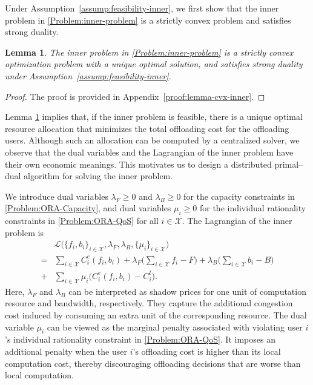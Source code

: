 \documentclass[lettersize,journal]{IEEEtran}
\newtheorem{lemma}{Lemma}
\begin{document}
Under Assumption~\ref{assump:feasibility-inner}, we first show that the inner problem in \eqref{Problem:inner-problem} is a strictly convex problem and satisfies strong duality.

\begin{lemma}\label{lemma-cvx-inner}
The inner problem in \eqref{Problem:inner-problem} is a strictly convex optimization problem with a unique optimal solution, and satisfies strong duality under Assumption~\ref{assump:feasibility-inner}.
\end{lemma}
\begin{proof}
The proof is provided in Appendix~\ref{proof:lemma-cvx-inner}.
\end{proof}

Lemma \ref{lemma-cvx-inner} implies that, if the inner problem is feasible, there is a unique optimal resource allocation that minimizes the total offloading cost for the offloading users. Although such an allocation can be computed by a centralized solver, we observe that the dual variables and the Lagrangian of the inner problem have their own economic meanings. This motivates us to design a distributed primal–dual algorithm for solving the inner problem.

We introduce dual variables
\(\lambda_F \ge 0\) and \(\lambda_B \ge 0\) for the capacity constraints in
\eqref{Problem:ORA-Capacity}, and dual variables \(\mu_i \ge 0\) for the individual rationality constraints in
\eqref{Problem:ORA-QoS} for all \(i\in \mathcal{X}\). The Lagrangian of the inner problem is
\begin{align}
&\mathcal{L}\big(\{f_i,b_i\}_{i\in \mathcal{X}},\lambda_F,\lambda_B,\{\mu_i\}_{i\in \mathcal{X}}\big)\nonumber\\
= &\sum_{i\in \mathcal{X}} C_i^e(f_i,b_i)
+ \lambda_F\Big(\sum_{i\in \mathcal{X}} f_i - F\Big)
+ \lambda_B\Big(\sum_{i\in \mathcal{X}} b_i - B\Big)\nonumber\\ + &\sum_{i\in \mathcal{X}} \mu_i\big(C_i^e(f_i,b_i) - C_i^l\big). \label{eq:Lagrangian-inner}
\end{align}
Here, $\lambda_F$ and $\lambda_B$ can be interpreted as shadow prices for one unit of computation resource and bandwidth, respectively. They capture the additional congestion cost induced by consuming an extra unit of the corresponding resource. The dual variable $\mu_i$ can be viewed as the marginal penalty associated with violating user $i$'s individual rationality constraint in \eqref{Problem:ORA-QoS}. It imposes an additional penalty when the user $i$'s offloading cost is higher than its local computation cost, thereby discouraging offloading decisions that are worse than local computation.
\end{document}
